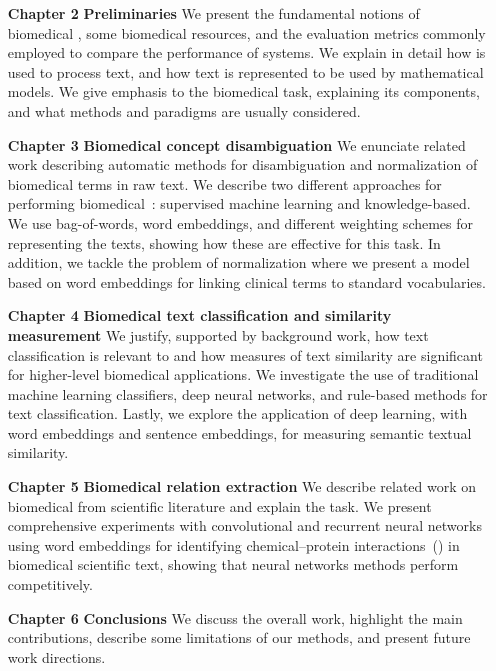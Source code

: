 \begin{enumerate}[%
wide=0pt,%
labelwidth=\mywidth,
labelsep=5mm,%
leftmargin=\dimexpr\labelwidth+\labelsep\relax,%
]

\item[\textbf{Chapter 2}]
\textbf{Preliminaries}\newline
We present the fundamental notions of biomedical , some biomedical resources, and the evaluation metrics commonly employed to compare the performance of  systems.
We explain in detail how  is used to process text, and how text is represented to be used by mathematical models.
We give emphasis to the biomedical  task, explaining its components, and what methods and paradigms are usually considered.

\item[\textbf{Chapter 3}]
\textbf{Biomedical concept disambiguation}\newline
We enunciate related work describing automatic methods for disambiguation and normalization of biomedical terms in raw text.
We describe two different approaches for performing biomedical~: supervised machine learning and knowledge-based.
We use bag-of-words, word embeddings, and different weighting schemes for representing the texts, showing how these are effective for this task.
In addition, we tackle the problem of normalization where we present a model based on word embeddings for linking clinical terms to standard vocabularies.

\item[\textbf{Chapter 4}]
\textbf{Biomedical text classification and similarity measurement}\newline
We justify, supported by background work, how text classification is relevant to  and how measures of text similarity are significant for higher-level biomedical  applications.
We investigate the use of traditional machine learning classifiers, deep neural networks, and rule-based methods for text classification.
Lastly, we explore the application of deep learning, with word embeddings and sentence embeddings, for measuring semantic textual similarity.

\item[\textbf{Chapter 5}]
\textbf{Biomedical relation extraction}\newline
We describe related work on biomedical  from scientific literature and explain the task.
We present comprehensive experiments with convolutional and recurrent neural networks using word embeddings for identifying chemical--protein interactions~() in biomedical scientific text, showing that neural networks methods perform competitively.

\item[\textbf{Chapter 6}]
\textbf{Conclusions}\newline
We discuss the overall work, highlight the main contributions, describe some limitations of our methods, and present future work directions.

\end{enumerate}


